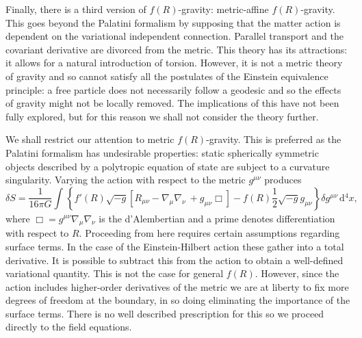 \documentclass[aps,prd,reprint,showpacs]{revtex4-1}
\newcommand{\dd}{\ensuremath{\text{d}}}
\newcommand{\intd}[4]{\ensuremath{\int_{#1}^{#2}{#3}\,\dd{#4}}}
\newcommand{\recip}[1]{\ensuremath{\frac{1}{#1}}}
\begin{document}
Finally, there is a third version of $f(R)$-gravity: metric-affine $f(R)$-gravity\cite{Sotiriou2007, Sotiriou2007b}. This goes beyond the Palatini formalism by supposing that the matter action is dependent on the variational independent connection. Parallel transport and the covariant derivative are divorced from the metric. This theory has its attractions: it allows for a natural introduction of torsion. However, it is not a metric theory of gravity and so cannot satisfy all the postulates of the Einstein equivalence principle\cite{Will2006}: a free particle does not necessarily follow a geodesic and so the effects of gravity might not be locally removed\cite{Exirifard2008}. The implications of this have not been fully explored, but for this reason we shall not consider the theory further.

We shall restrict our attention to metric $f(R)$-gravity. This is preferred as the Palatini formalism has undesirable properties: static spherically symmetric objects described by a polytropic equation of state are subject to a curvature singularity\cite{Barausse2008b, Barausse2008a}. Varying the action with respect to the metric $g^{\mu\nu}$ produces
\begin{equation}
\delta S = \recip{16\pi G}\intd{}{}{\left\{f'(R)\sqrt{-g}\left[R_{\mu\nu} - \nabla_\mu\nabla_\nu\ + g_{\mu\nu}\Box\right] - f(R)\frac{1}{2}\sqrt{-g}g_{\mu\nu}\right\}\delta g^{\mu\nu}}{^4x},
\end{equation}
where $\Box = g^{\mu\nu}\nabla_\mu\nabla_\nu$ is the d'Alembertian and a prime denotes differentiation with respect to $R$. Proceeding from here requires certain assumptions regarding surface terms. In the case of the Einstein-Hilbert action these gather into a total derivative. It is possible to subtract this from the action to obtain a well-defined variational quantity\cite{York1972, Gibbons1977}. This is not the case for general $f(R)$\cite{Madsen1989}. However, since the action includes higher-order derivatives of the metric we are at liberty to fix more degrees of freedom at the boundary, in so doing eliminating the importance of the surface terms\cite{Dyer2009a, Sotiriou2010}. There is no well described prescription for this so we proceed directly to the field equations.
\end{document}
